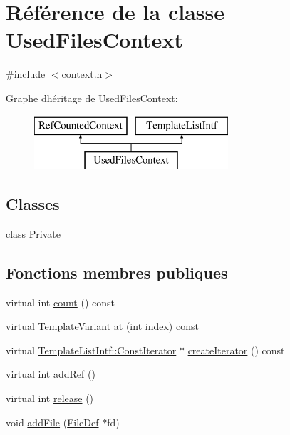 \hypertarget{class_used_files_context}{}\section{Référence de la classe Used\+Files\+Context}
\label{class_used_files_context}


{\ttfamily \#include $<$context.\+h$>$}

Graphe d\textquotesingle{}héritage de Used\+Files\+Context\+:\begin{figure}[H]
\begin{center}
\leavevmode
\includegraphics[height=2.000000cm]{class_used_files_context}
\end{center}
\end{figure}
\subsection*{Classes}
\begin{DoxyCompactItemize}
\item 
class \hyperlink{class_used_files_context_1_1_private}{Private}
\end{DoxyCompactItemize}
\subsection*{Fonctions membres publiques}
\begin{DoxyCompactItemize}
\item 
virtual int \hyperlink{class_used_files_context_a27b097e9e91dce2af2df21d94466301e}{count} () const 
\item 
virtual \hyperlink{class_template_variant}{Template\+Variant} \hyperlink{class_used_files_context_a0e794d8e1fd240fc31f53cf6df858b73}{at} (int index) const 
\item 
virtual \hyperlink{class_template_list_intf_1_1_const_iterator}{Template\+List\+Intf\+::\+Const\+Iterator} $\ast$ \hyperlink{class_used_files_context_a5f78c46c8e88793abc287c48496ca11b}{create\+Iterator} () const 
\item 
virtual int \hyperlink{class_used_files_context_a3346f9de5fe74a7c0b962fa546240298}{add\+Ref} ()
\item 
virtual int \hyperlink{class_used_files_context_ad179f197716bee4f11482390962cb180}{release} ()
\item 
void \hyperlink{class_used_files_context_aa4f8390a396a3c5fffe62a18063506aa}{add\+File} (\hyperlink{class_file_def}{File\+Def} $\ast$fd)
\end{DoxyCompactItemize}
